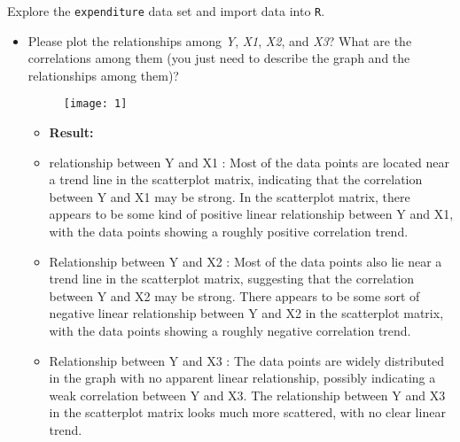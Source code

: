 \documentclass[12pt,letterpaper]{article}
\begin{document}
\vspace{.5cm}
\noindent Explore the \texttt{expenditure} data set and import data into \texttt{R}.
\vspace{.5cm}
  
\vspace{.5cm}
\begin{itemize}

\item
Please plot the relationships among \emph{Y}, \emph{X1}, \emph{X2}, and \emph{X3}? What are the correlations among them (you just need to describe the graph and the relationships among them)?
\vspace{.5cm}
 
\begin{figure}[H]
	\centering
	\texttt{[image: 1]}
\end{figure}

		\begin{itemize}
	\item \textbf{Result:}
	\item   relationship between Y and X1 :
	Most of the data points are located near a trend line in the scatterplot matrix, indicating that the correlation between Y and X1 may be strong.
	In the scatterplot matrix, there appears to be some kind of positive linear relationship between Y and X1, with the data points showing a roughly positive correlation trend.
	
	\item  Relationship between Y and X2 :
	Most of the data points also lie near a trend line in the scatterplot matrix, suggesting that the correlation between Y and X2 may be strong.
	There appears to be some sort of negative linear relationship between Y and X2 in the scatterplot matrix, with the data points showing a roughly negative correlation trend.
	
	\item  Relationship between Y and X3 :
	The data points are widely distributed in the graph with no apparent linear relationship, possibly indicating a weak correlation between Y and X3.
	The relationship between Y and X3 in the scatterplot matrix looks much more scattered, with no clear linear trend.
	

\end{itemize}
\end{itemize}
\end{document}
